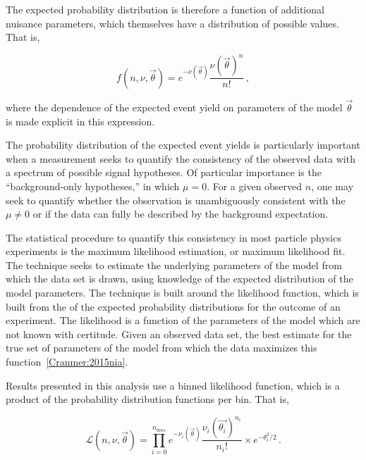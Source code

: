 The expected probability distribution is therefore a function of additional
nuisance parameters, which themselves have a distribution of possible values.
That is, 

\begin{equation}
  f(n, \nu, \vec{\theta}) = e^{-\nu(\vec{\theta})}\frac{\nu(\vec{\theta})^{n}}{n!} \,,
\end{equation}

where the dependence of the expected event yield on parameters 
of the model $\vec{\theta}$ is made explicit in this expression.

The probability distribution of the expected event yields is particularly important
when a measurement seeks to quantify the consistency of the observed data
with a spectrum of possible signal hypotheses. 
Of particular importance is the 
``background-only hypotheses,'' in which $\mu = 0$. For a given observed
$n$, one may seek to quantify whether the observation is unambiguously
consistent with the $\mu \ne 0$ or if the data can fully be described by
the background expectation. 

The statistical procedure to quantify this consistency in most particle 
physics experiments is the maximum likelihood estimation, or maximum
likelihood fit. The technique seeks to estimate the underlying parameters
of the model from which the data set is drawn, using knowledge of the
expected distribution of the model parameters. The technique is built around the
likelihood function, which is built from the
of the expected probability distributions for the
outcome of an experiment. 
The likelihood is a function of the parameters of the model which are not 
known with certitude.
Given an observed data set, the best estimate for 
the true set of parameters of the model from which the data
maximizes this function~\ref{Cranmer:2015nia}.

Results presented in this analysis
use a binned likelihood function, which is a product of the probability
distribution functions per bin. That is,


\begin{equation}
  \mathcal{L}(n, \nu, \vec{\theta}) = \prod_{i=0}^{n_{bins}} 
      e^{-\nu_{i}(\vec{\theta})}\frac{\nu_{i}(\vec{\theta_{i}})^{n_i}}{n_i!} 
      \times e^{-\theta_{i}^2/2} \,.
\label{eq:likelihood}
\end{equation}

